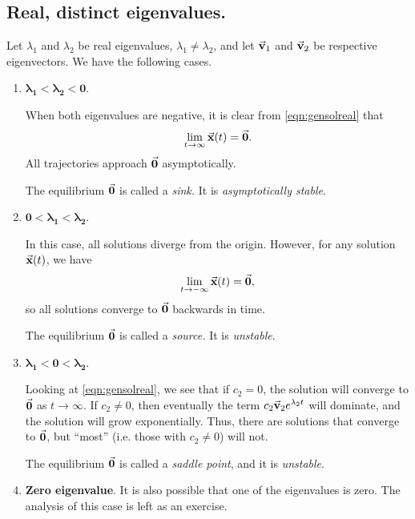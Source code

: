 \subsection*{Real, distinct eigenvalues.}
Let $\lambda_1$ and $\lambda_2$ be real eigenvalues,
$\lambda_1\ne\lambda_2$, and let $\vec{\textbf{v}}_1$ and $\vec{\textbf{v}}_2$
be respective eigenvectors.  We have the following
cases.
\begin{enumerate}
\item $\pmb{\lambda_1 < \lambda_2 < 0}$.

\noindent
When both eigenvalues are negative, it is clear from
\eqref{eqn:gensolreal}
that
\[
  \lim_{t\rightarrow\infty}\vec{\textbf{x}}(t) = \vec{\textbf{0}}.
\]
All trajectories approach $\vec{\textbf{0}}$ asymptotically.

\noindent
The equilibrium $\vec{\textbf{0}}$ is called a \emph{sink.}
It is \emph{asymptotically stable}.

\smallskip

\item $\pmb{0 < \lambda_1 < \lambda _2}$.

\noindent
In this case, all solutions diverge from the origin.
However, for any solution $\vec{\textbf{x}}(t)$, we have
\[
  \lim_{t\rightarrow -\infty}\vec{\textbf{x}}(t) = \vec{\textbf{0}},
\]
so all solutions 
converge to $\vec{\textbf{0}}$ backwards in time.

\noindent
The equilibrium $\vec{\textbf{0}}$ is called a \emph{source.}
It is \emph{unstable}.

\smallskip

\item $\pmb{\lambda_1 < 0 < \lambda_2}$.

\noindent
Looking at \eqref{eqn:gensolreal}, we see that if $c_2=0$, the solution
will converge to $\vec{\textbf{0}}$ as $t\rightarrow\infty$.
If $c_2\ne 0$, then eventually the term $c_2\vec{\textbf{v}}_2e^{\lambda_2 t}$ will
dominate, and the solution will grow exponentially.
Thus, there are solutions that converge to $\vec{\textbf{0}}$, but ``most''
(i.e. those with $c_2\ne 0$) will not.

\noindent
The equilibrium $\vec{\textbf{0}}$ is called a \emph{saddle point}, 
and it is \emph{unstable}.

\smallskip

\item \textbf{Zero eigenvalue}.  It is also possible that
one of the eigenvalues is zero.  The analysis
of this case is left as an exercise.
\end{enumerate}

